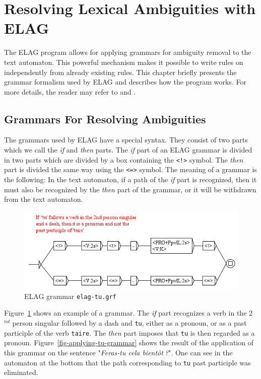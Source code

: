 \clearpage
\section{Resolving Lexical Ambiguities with ELAG}
The ELAG program allows for applying grammars for ambiguity removal to the
text automaton. This powerful mechanism makes it possible to write rules on
independently from already existing rules. This chapter briefly presents the
grammar formalism used by ELAG and describes how the program works. For more
details, the reader may refer to \cite{elag-blanc-dister} and \cite{ELAG}.


\subsection{Grammars For Resolving Ambiguities}
\label{section-elag-grammars}
The grammars used by ELAG have a special syntax. They consist of two parts which
we call the \textit{if} and \textit{then} parts. The \textit{if} part of an ELAG
grammar is divided in two parts which are divided by a box containing the \verb+<!>+ symbol. 
The \textit{then}
part is divided the same way using the \verb+<=>+ symbol. The meaning of a
grammar is the following: In the text automaton, if a path of the \textit{if}
part is recognized, then it must also be recognized by the \textit{then} part
of the grammar, or it will be withdrawn from the text automaton.

\begin{figure}[!ht]
\begin{center}
\includegraphics[width=13.1cm]{resources/img/fig7-12.png}
\caption{ELAG grammar \texttt{elag-tu.grf}\label{fig-elag-tu}}
\end{center}
\end{figure}

\bigskip
\noindent Figure~\ref{fig-elag-tu} shows an example of a grammar. The
\textit{if} part recognizes a verb in the 2$^{nd}$ person singular followed by a dash and
\verb+tu+, either as a pronoun, or as a past participle of the verb
\verb+taire+. The \textit{then} part imposes that \verb+tu+ is then regarded as
a pronoun. Figure~\ref{fig-applying-tu-grammar} shows the result of the
application of this grammar on the sentence "\textit{Feras-tu cela
bient\^ot$~$?}". One can see in the automaton at the bottom that the path
corresponding to \verb+tu+ past participle was eliminated.


